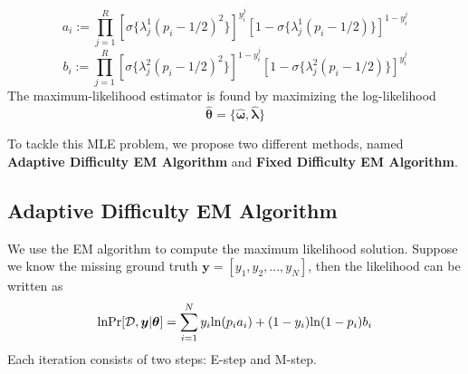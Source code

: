 \documentclass{article}
\begin{document}
$$a_i:=\prod_{j=1}^R[\sigma\{ \lambda_j^1(p_i-1/2)^2 \}]^{y_i^j} [1-\sigma\{ \lambda_j^1 (p_i-1/2) \}]^{1-y_i^j} $$
$$b_i:=\prod_{j=1}^R[\sigma\{ \lambda_j^2(p_i-1/2)^2 \}]^{1-y_i^j} [1-\sigma\{ \lambda_j^2 (p_i-1/2) \}]^{y_i^j} $$
The maximum-likelihood estimator is found by maximizing the log-likelihood
$$\hat{\bm{\theta}}=\lbrace \bm{\hat{\omega},\hat{\lambda}}\}$$

To tackle this MLE problem, we propose two different methods, named \textbf{Adaptive Difficulty EM Algorithm} and \textbf{Fixed Difficulty EM Algorithm}.
\subsection{Adaptive Difficulty EM Algorithm}
We use the EM algorithm to compute the maximum likelihood solution. Suppose we know the missing ground truth $\bm{y}=[y_1,y_2,...,y_N]$, then the likelihood can be written as 
$$\textup{ln} \textup{Pr}[\mathcal{D},\bm{y}|\bm{\theta}]=\sum_{i=1}^N y_i \textup{ln}(p_ia_i)+(1-y_i)\textup{ln}(1-p_i)b_i$$
Each iteration consists of two steps: E-step and M-step.
\end{document}
